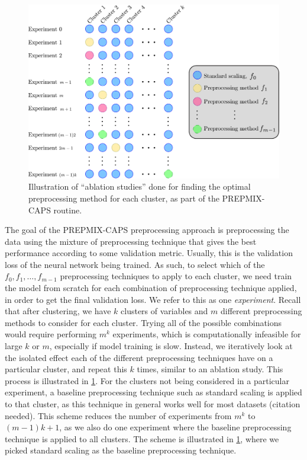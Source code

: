 \documentclass{statsmsc}
\begin{document}
{\begin{figure}[htp]
    \vspace*{-15pt}
    \begin{center}
        \includegraphics[width=\textwidth]{diagrams/prepmix-diagram.pdf}
    \end{center}
    \caption{Illustration of ``ablation studies'' done for finding the optimal preprocessing method
    for each cluster, as part of the \ac{PREPMIX-CAPS} routine.}
    \label{fig:prepmix}
    \vspace*{-15pt}
\end{figure}

The goal of the \ac{PREPMIX-CAPS} preprocessing approach is preprocessing the
data using the mixture of preprocessing technique that gives the best
performance according to some validation metric. Usually, this is the
validation loss of the neural network being trained. As such, to select which
of the $f_0, f_1,\dots,f_{m-1}$ preprocessing techniques to apply to each
cluster, we need train the model from scratch for each combination of
preprocessing technique applied, in order to get the final validation loss.
We refer to this as one \textit{experiment}.
Recall that after clustering, we have $k$ clusters of variables and $m$ different
preprocessing methods to consider for each cluster. Trying all of the possible
combinations would require performing $m^k$ experiments, which is
computationally infeasible for large $k$ or $m$, especially if model training
is slow. Instead, we iteratively look at the isolated effect each of the
different preprocessing techniques have on a particular cluster, and repeat
this $k$ times, similar to an ablation study. This process is illustrated in
\cref{fig:prepmix}. For the clusters not being
considered in a particular experiment, a baseline preprocessing technique such
as standard scaling is applied to that cluster, as this technique in general
works well for most datasets (citation needed). This scheme reduces the number
of experiments from $m^k$ to $(m-1)k+1$, as we also do one experiment where the
baseline preprocessing technique is applied to all clusters. The scheme is
illustrated in \cref{fig:prepmix}, where we picked standard scaling as the
baseline preprocessing technique.

}
\end{document}
